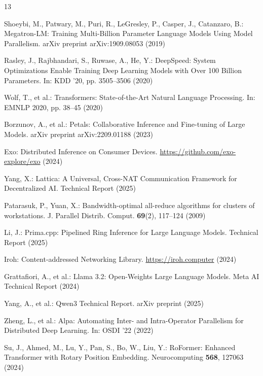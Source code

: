 \documentclass[runningheads]{llncs}
\begin{document}

\begin{thebibliography}{13}

Shoeybi, M., Patwary, M., Puri, R., LeGresley, P., Casper, J., Catanzaro, B.: Megatron-LM: Training Multi-Billion Parameter Language Models Using Model Parallelism. arXiv preprint arXiv:1909.08053 (2019)

Rasley, J., Rajbhandari, S., Ruwase, A., He, Y.: DeepSpeed: System Optimizations Enable Training Deep Learning Models with Over 100 Billion Parameters. In: KDD '20, pp. 3505--3506 (2020)

Wolf, T., et al.: Transformers: State-of-the-Art Natural Language Processing. In: EMNLP 2020, pp. 38--45 (2020)

Borzunov, A., et al.: Petals: Collaborative Inference and Fine-tuning of Large Models. arXiv preprint arXiv:2209.01188 (2023)

Exo: Distributed Inference on Consumer Devices. \url{https://github.com/exo-explore/exo} (2024)

Yang, X.: Lattica: A Universal, Cross-NAT Communication Framework for Decentralized AI. Technical Report (2025)

Patarasuk, P., Yuan, X.: Bandwidth-optimal all-reduce algorithms for clusters of workstations. J. Parallel Distrib. Comput. \textbf{69}(2), 117--124 (2009)

Li, J.: Prima.cpp: Pipelined Ring Inference for Large Language Models. Technical Report (2025)

Iroh: Content-addressed Networking Library. \url{https://iroh.computer} (2024)

Grattafiori, A., et al.: Llama 3.2: Open-Weights Large Language Models. Meta AI Technical Report (2024)

Yang, A., et al.: Qwen3 Technical Report. arXiv preprint (2025)

Zheng, L., et al.: Alpa: Automating Inter- and Intra-Operator Parallelism for Distributed Deep Learning. In: OSDI '22 (2022)

Su, J., Ahmed, M., Lu, Y., Pan, S., Bo, W., Liu, Y.: RoFormer: Enhanced Transformer with Rotary Position Embedding. Neurocomputing \textbf{568}, 127063 (2024)

\end{thebibliography}
\end{document}
